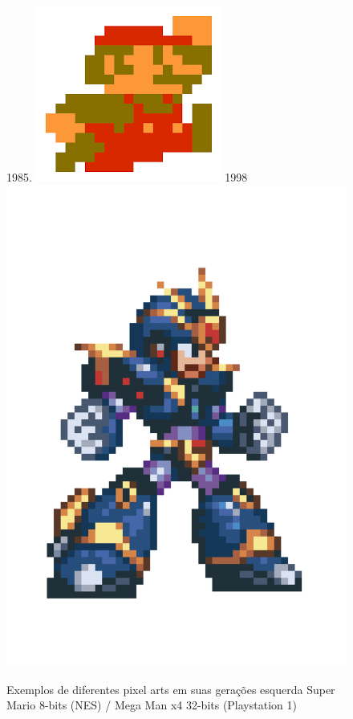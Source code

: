 \begin{figure}[ht!]
    \caption{Exemplos de diferentes pixel arts em suas gerações esquerda Super Mario 8-bits (NES) /  Mega Man x4 32-bits (Playstation 1)}
    \label{fig:comparative-8bit-32-bit-pixel-art}
    \subfloat\label{fig:mario}1985.{
        \includegraphics[width=0.35\linewidth]{figuras/mario-sprite-nes.png}
    }\hfill
    \subfloat\label{fig:mega_man}1998{
        \includegraphics[width=0.3\linewidth]{figuras/mega-man-ps1.png}
    }
\end{figure}

\newpage
